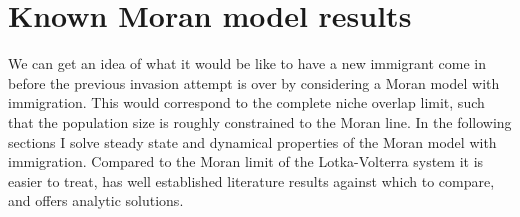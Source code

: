 \section{Known Moran model results}


We can get an idea of what it would be like to have a new immigrant come in before the previous invasion attempt is over by considering a Moran model with immigration.
This would correspond to the complete niche overlap limit, such that the population size is roughly constrained to the Moran line. 
In the following sections I solve steady state and dynamical properties of the Moran model with immigration. 
Compared to the Moran limit of the Lotka-Volterra system it is easier to treat, has well established literature results against which to compare, and offers analytic solutions. 

